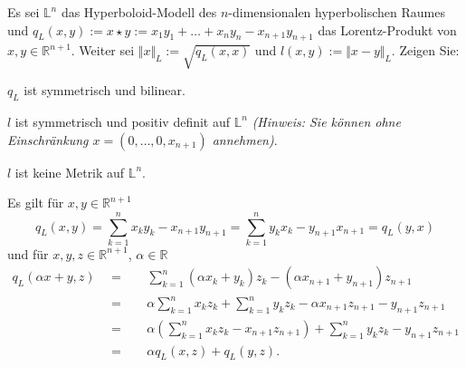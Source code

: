 \documentclass[11pt]{book}
\numberwithin{dummy}{section}
\theoremstyle{nonumberbreak}
\newenvironment{prob}[1][]{\ifthenelse{\equal{#1}{}}{\problem}{\problem[#1]}\rm}{\endproblem}
\newenvironment{sol}[1][]{\ifthenelse{\equal{#1}{}}{\solution}{\solution[#1]}\rm}{\endsolution}
\newcommand{\Loid}{\mathbb{L}}
\newcommand{\R}{\mathbb{R}}
\begin{document}
\begin{spacing}{1.4}
\begin{prob}
\begin{sol}
\begin{compactenum}
\end{compactenum}

\end{sol}

\end{prob}



\begin{prob}   %
Es sei $\Loid^n$ das Hyperboloid-Modell des $n$-dimensionalen hyperbolischen Raumes und $q_L(x,y):= x \star y := x_1y_1 + \ldots + x_n y_n - x_{n+1}y_{n+1}$ das Lorentz-Produkt von $x,y \in \R^{n+1}$. Weiter sei $\Vert x\Vert_L:= \sqrt{q_L(x,x)}$ und $l(x,y):=\Vert x-y \Vert_L$. Zeigen Sie:
\begin{compactenum}
\item $q_L$ ist symmetrisch und bilinear.
\item $l$ ist symmetrisch und positiv definit auf $\Loid^n$ \textit{(Hinweis: Sie können ohne Einschränkung $x=(0,\ldots, 0,x_{n+1})$ annehmen)}.
\item $l$ ist keine Metrik auf $\Loid^n$.

\end{compactenum}


\begin{sol}

\begin{compactenum}

\item Es gilt für $x,y \in \R^{n+1}$
$$q_L(x,y) = \sum_{k=1}^n x_ky_k - x_{n+1}y_{n+1} =\sum_{k=1}^n y_k x_k - y_{n+1}x_{n+1} = q_L(y,x)$$
und für $x,y,z\in \R^{n+1}$, $\alpha \in \R$
\begin{alignat*}{5}
q_L(\alpha x + y, z ) \ \ &=&& \ \ \sum_{k=1}^n (\alpha x_k+y_k) z_k - (\alpha x_{n+1} + y_{n+1})z_{n+1} \\ 
&=&& \ \ \alpha \sum_{k=1}^n x_k z_k + \sum_{k=1}^n y_kz_k - \alpha x_{n+1}z_{n+1} - y_{n+1}z_{n+1}\\
&=&& \ \ \alpha \left( \sum_{k=1}^n x_kz_k - x_{n+1}z_{n+1}\right) + \sum_{k=1}^n y_kz_k - y_{n+1}z_{n+1} \\
&=&& \ \ \alpha q_L(x,z) + q_L(y,z).
\end{alignat*}


\end{compactenum}
\end{sol}
\end{prob}
\end{spacing}
\end{document}

